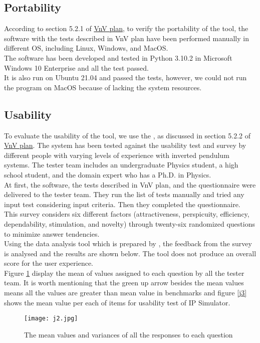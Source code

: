 \documentclass[12pt, titlepage]{article}
\begin{document}
\subsection{Portability\label{portability}}
According to section 5.2.1 of \href{https://github.com/MinMah23/CAS741-Project/tree/main/docs/VnVPlan}{VnV plan}, to verify the portability of the tool, the software with the tests described in VnV plan have been performed manually in different OS, including Linux, Windows, and MacOS.\\
The software has been developed and tested in Python 3.10.2 in Microsoft Windows 10 Enterprise and all the test passed.\\
It is also run on Ubuntu 21.04 and passed the tests, however, we could not run the program on MacOS because of lacking the system resources.\\

\subsection{Usability}\label{use}
To evaluate the usability of the tool, we use the \cite{hinderks_schrepp_thomaschewski}, as discussed in section 5.2.2 of \href{https://github.com/MinMah23/CAS741-Project/tree/main/docs/VnVPlan}{VnV plan}. 
The system has been tested against the usability test and survey by different people with varying levels of experience with inverted pendulum systems. The tester team includes an undergraduate Physics student, a high school student, and the domain expert who has a Ph.D. in Physics.\\
At first, the software, the tests described in VnV plan, and the questionnaire were delivered to the tester team. They run the list of tests manually and tried any input test considering input criteria. Then they completed the questionnaire.\\
 This survey considers six different factors (attractiveness, perspicuity, efficiency, dependability, stimulation, and novelty) through twenty-six randomized questions to minimize answer tendencies.\\

Using the data analysis tool which is prepared by \cite{hinderks_schrepp_thomaschewski}, the feedback from the survey is analysed and the results are shown below. The tool does not produce an overall score for the user experience.\\
Figure \ref{j2} display the mean of values assigned to each question by all the tester team. It is worth mentioning that the green up arrow besides the mean values means all the values are greater than mean value in benchmarks and figure \ref{j3} shows the mean value per each of items for usability test of IP Simulator.
 \begin{figure}[H]
\begin{center}
\texttt{[image: j2.jpg]}
 \caption{The mean values and variances of all the responses to each question}
 \label{j2}
 \end{center}
 \end{figure}
\end{document}
